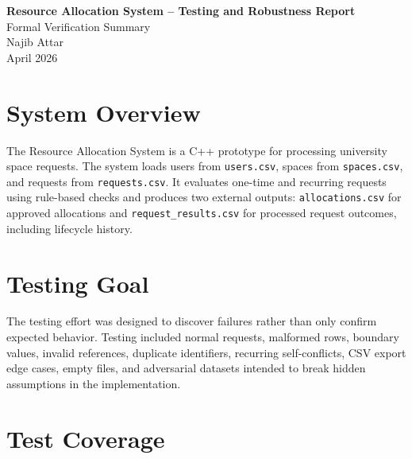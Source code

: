 \documentclass[12pt,a4paper]{article}
\begin{document}
\begin{center}
    {\LARGE \textbf{Resource Allocation System -- Testing and Robustness Report}}\\[0.4cm]
    {\large Formal Verification Summary}\\[0.3cm]
    Najib Attar\\
    April 2026
\end{center}

\section{System Overview}
The Resource Allocation System is a C++ prototype for processing university space requests. The system loads users from \texttt{users.csv}, spaces from \texttt{spaces.csv}, and requests from \texttt{requests.csv}. It evaluates one-time and recurring requests using rule-based checks and produces two external outputs: \texttt{allocations.csv} for approved allocations and \texttt{request\_results.csv} for processed request outcomes, including lifecycle history.

\section{Testing Goal}
The testing effort was designed to discover failures rather than only confirm expected behavior. Testing included normal requests, malformed rows, boundary values, invalid references, duplicate identifiers, recurring self-conflicts, CSV export edge cases, empty files, and adversarial datasets intended to break hidden assumptions in the implementation.

\section{Test Coverage}

\end{document}
